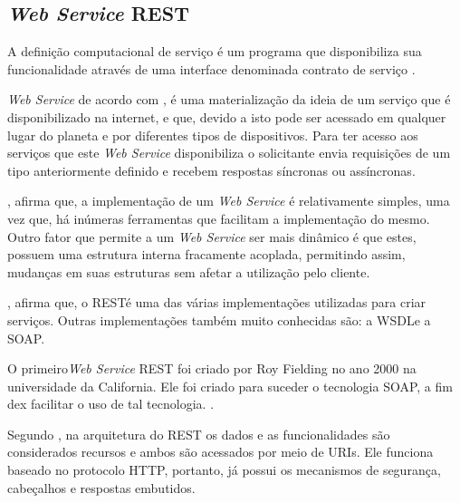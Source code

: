 \subsection{\textit{Web Service} REST}

A definição computacional de serviço é um programa que disponibiliza sua funcionalidade através de uma interface denominada contrato de serviço \cite{erl_soa_with_rest}.

\textit{Web Service} de acordo com , é uma materialização da ideia de um serviço que é disponibilizado na internet, e que, devido a isto pode ser acessado em qualquer lugar do planeta e por diferentes tipos de dispositivos. Para ter acesso aos serviços que este \textit{Web Service} disponibiliza o solicitante envia requisições de um tipo anteriormente definido e recebem respostas síncronas ou assíncronas.

, afirma que, a implementação de um \textit{Web Service} é relativamente simples, uma vez que, há inúmeras ferramentas que facilitam a implementação do mesmo. Outro fator que permite a um \textit{Web Service} ser mais dinâmico é que estes, possuem uma estrutura interna fracamente acoplada, permitindo assim, mudanças em suas estruturas sem afetar a utilização pelo cliente.

, afirma que, o REST\footnotemark[17] é uma das várias implementações utilizadas para criar serviços. Outras implementações também muito conhecidas são: a WSDL\footnotemark[18] e a SOAP\footnotemark[19].




O primeiro\textit{Web Service} REST foi criado por Roy Fielding no ano 2000 na universidade da California. Ele foi criado para suceder o tecnologia SOAP, a fim dex facilitar o uso de tal tecnologia. \cite{ibm_web_service}.

Segundo , na arquitetura do REST os dados e as funcionalidades são considerados recursos e ambos são acessados por meio de  URIs\footnotemark[20]. Ele funciona baseado no protocolo HTTP, portanto, já possui os mecanismos de segurança, cabeçalhos e respostas embutidos.

